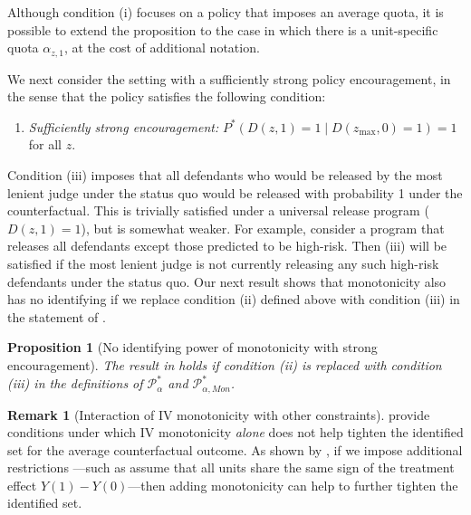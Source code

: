 \documentclass[12pt]{article}%
\newtheorem{prop}{Proposition}
\theoremstyle{definition}
\newtheorem{remark}{Remark}
\newcommand\1{\operatorname{I}\indicatorfence}
\begin{document}
Although condition (i) focuses on a policy
that imposes an average quota, it is possible to extend the proposition to the
case in which there is a unit-specific quota $\alpha_{z,1}$, at the cost of
additional notation.

We next consider the setting with a sufficiently strong policy encouragement, in the sense that the policy satisfies
the following condition:
\begin{enumerate}
\item[(iii)]\label{item:iv_strong_encouragement}\emph{Sufficiently strong
    encouragement:} $P^*(D(z,1) =1 \mid D(z_{\max},0) =1)=1$ for all $z$.
\end{enumerate}
Condition (iii) imposes that all defendants who would be released by the most lenient judge under
the status quo would be released with probability 1 under the counterfactual.
This is trivially satisfied under a universal release program ($D(z,1)=1$), but
is somewhat weaker. For example, consider a program that releases all defendants
except those predicted to be high-risk. Then (iii) will be satisfied if
the most lenient judge is not currently releasing any such high-risk defendants
under the status quo. Our next result shows that monotonicity also has no
identifying if we replace condition (ii) defined above with condition (iii) in
the statement of .

\begin{prop}[No identifying power of monotonicity with strong
  encouragement]\label{prop:monotonicity_is_not_helpful_strong_encouragement}
  The result in  holds if condition (ii)
  is replaced with condition (iii) in the definitions of $\mathcal{P}^*_{\alpha}$
  and $\mathcal{P}^*_{\alpha, Mon}$.
\end{prop}

\begin{remark}[Interaction of IV monotonicity with other constraints]
  provide conditions under which IV monotonicity \emph{alone} does not help
  tighten the identified set for the average counterfactual outcome. As shown by
  \textcite{machado_instrumental_2019}, if we impose additional restrictions
  ---such as assume that all units share the same sign of the treatment effect
  $Y(1)-Y(0)$---then adding monotonicity can help to further tighten the
  identified set.
\end{remark}
\end{document}
